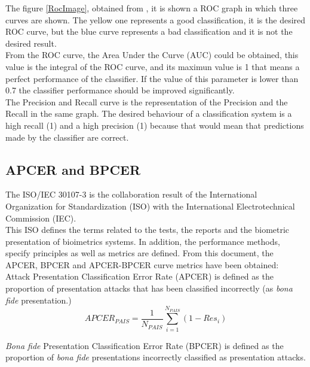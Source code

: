 The figure \ref{RocImage}, obtained from \cite{RocImage}, it is shown a ROC graph in which three curves are shown.  The yellow one represents a good classification, it is the desired ROC curve, but the blue curve represents a bad classification and it is not the desired result.\\

From the ROC curve, the Area Under the Curve (AUC) could be obtained, this value is the integral of the ROC curve, and its maximun value is 1 that means a perfect performance of the classifier. If the value of this parameter is lower than 0.7 the classifier performance should be improved significantly.\\

The Precision and Recall curve is the representation of the Precision and the Recall in the same graph. The desired behaviour of a classification system is a high recall (1) and a high precision (1) because that would mean that predictions made by the classifier are correct.\\

\subsection{APCER and BPCER}
The ISO/IEC 30107-3 \cite{ISO} is the collaboration result of  the International Organization for Standardization (ISO) with the International Electrotechnical Commission (IEC).\\

This ISO defines the terms related to the tests, the reports and the biometric presentation of bioimetrics systems. In addition, the performance methods, specify principles as well as metrics are defined. From this document, the APCER, BPCER and APCER-BPCER curve metrics have been obtained:\\

Attack Presentation Classification Error Rate (APCER) is defined as the proportion of presentation attacks that has been classified incorrectly (as \textit{bona fide} presentation.)\\

\begin{equation}
  APCER_{PAIS} = \frac{1}{N_{PAIS}}\sum_{i=1}^{N_{PAIS}}(1 - Res_{i})
\end{equation}

\textit{Bona fide} Presentation Classification Error Rate (BPCER) is defined as the proportion of \textit{bona fide} presentations  incorrectly classified as presentation attacks.\\

